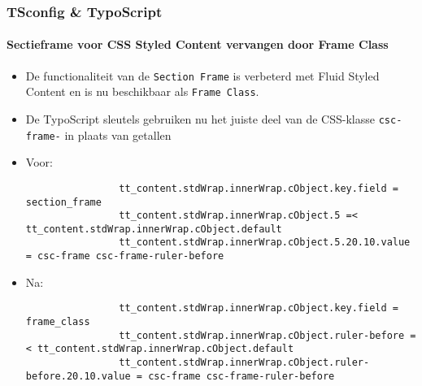 \begin{frame}[fragile]
	\frametitle{TSconfig \& TypoScript}
	\framesubtitle{Sectieframe voor CSS Styled Content vervangen door Frame Class}

	\lstset{basicstyle=\tiny\ttfamily}

	\begin{itemize}
		\item De functionaliteit van de \texttt{Section Frame} is verbeterd met Fluid Styled Content en is nu beschikbaar als \texttt{Frame Class}.
		\item De TypoScript sleutels gebruiken nu het juiste deel van de CSS-klasse \texttt{csc-frame-} in plaats van getallen
		\item Voor:

			\begin{lstlisting}
				tt_content.stdWrap.innerWrap.cObject.key.field = section_frame
				tt_content.stdWrap.innerWrap.cObject.5 =< tt_content.stdWrap.innerWrap.cObject.default
				tt_content.stdWrap.innerWrap.cObject.5.20.10.value = csc-frame csc-frame-ruler-before
			\end{lstlisting}

		\item Na:

			\begin{lstlisting}
				tt_content.stdWrap.innerWrap.cObject.key.field = frame_class
				tt_content.stdWrap.innerWrap.cObject.ruler-before =< tt_content.stdWrap.innerWrap.cObject.default
				tt_content.stdWrap.innerWrap.cObject.ruler-before.20.10.value = csc-frame csc-frame-ruler-before
			\end{lstlisting}

	\end{itemize}

\end{frame}

